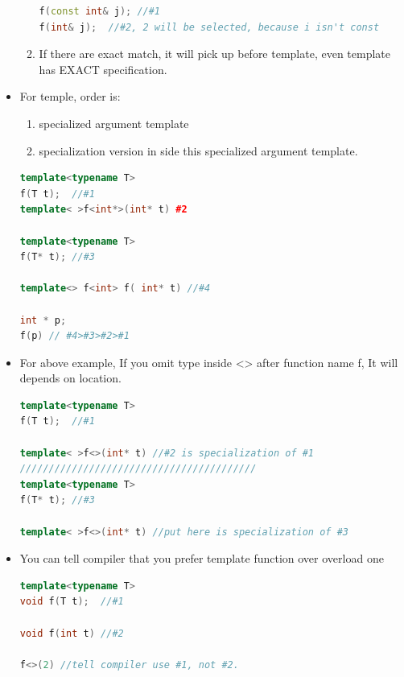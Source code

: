 \documentclass[a4paper,12pt,twoside]{book}
\begin{document}
\begin{itemize}
\begin{enumerate}
\begin{lstlisting}[frame=single, language=c++]
f(const int& j); //#1
f(int& j);  //#2, 2 will be selected, because i isn't const
\end{lstlisting}
\item If there are exact match, it will pick up before template, even template has EXACT specification.
\end{enumerate}

\item For temple, order is:
\begin{enumerate}
\item specialized argument template
\item specialization version in side this  specialized argument template.
\end{enumerate}
\begin{lstlisting}[frame=single, language=c++]
template<typename T>
f(T t);  //#1
template< >f<int*>(int* t) #2

template<typename T>
f(T* t); //#3

template<> f<int> f( int* t) //#4

int * p;
f(p) // #4>#3>#2>#1
\end{lstlisting}
\item For above example, If you omit type inside <> after function name f, It will depends on location.
\begin{lstlisting}[frame=single, language=c++]
template<typename T>
f(T t);  //#1

template< >f<>(int* t) //#2 is specialization of #1
/////////////////////////////////////////
template<typename T>
f(T* t); //#3

template< >f<>(int* t) //put here is specialization of #3
\end{lstlisting}
\item You can tell compiler that you prefer template function over overload one
\begin{lstlisting}[frame=single, language=c++]
template<typename T>
void f(T t);  //#1

void f(int t) //#2

f<>(2) //tell compiler use #1, not #2.
\end{lstlisting}

\end{itemize}
\end{document}
